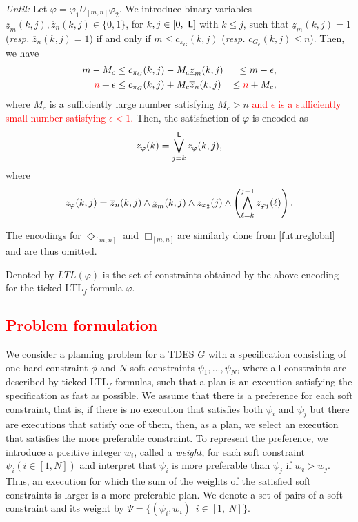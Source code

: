 \documentclass[journal,twoside,web]{IEEEtran}
\newcommand{\req}[1]{\eqref{#1}}
\newcommand{\Len}{{\sf L}}
\newcommand{\red}[1]{\textcolor{red}{#1}}
\begin{document}
\textit{Until:} 
Let $\varphi = \varphi_1 U_{[m,n]} \varphi_2$. We introduce binary variables $\underline{z}_m (k, j), \overline{z}_n (k, j) \in \{0, 1\}$, for $k, j \in [0,\ \Len]$ with $k\leq j$,
such that $\underline{z}_m (k,j) = 1$ ({\sl resp.} $\overline{z}_n (k, j) = 1$) if and only if $m \leq c_{\pi_G} (k, j)$ ({\sl resp.} $c_{G_e}(k,j) \leq n$). Then, we have 
\begin{eqnarray}
m - M_c &\leq c_{\pi_G} (k, j) - M_c \underline{z}_m(k,j) &\leq m - \epsilon, \notag\\ 
\red{n} + \epsilon  &\leq  c_{\pi_G} (k, j) + M_c \overline{z}_n(k,j) &\leq \red{n}+M_c, \notag
\end{eqnarray}
where $M_c$ is a sufficiently large number satisfying $M_c >n$ \red{and $\epsilon$ is a sufficiently small number satisfying $\epsilon<1$.} 
Then, the satisfaction of $\varphi$ is encoded as 
\begin{align}%
z_\varphi (k) = \bigvee^{\Len} _{j=k} z_\varphi (k, j),
\end{align}
where 
\begin{align}%
z_\varphi (k, j) = \overline{z}_n (k,j) \wedge  \underline{z}_m (k,j) \wedge z_{\varphi_2} (j) \wedge \left(\bigwedge^{j-1} _{\ell=k} z_{\varphi_1} (\ell) \right).  \notag 
\end{align}

The encodings for $\Diamond_{[m,n]}$ and $\Box_{[m,n]}$are similarly done from  \req{futureglobal} and are thus omitted. 
%

Denoted by $LTL(\varphi)$ is the set of constraints obtained by the above encoding for the ticked LTL$_f$ formula $\varphi$. 



%
\red{
\subsection{Problem formulation}\label{sec:pbm}
}
%
We consider a planning problem for a TDES $G$ with a specification consisting of one hard constraint $\phi$ and $N$ soft constraints $\psi_1,...,\psi_N$, where all constraints are described by ticked LTL$_f$ formulas, such that a plan is an execution satisfying the specification as fast as possible.
We assume that there is a preference for each soft constraint, that is, if there is no execution that satisfies both $\psi_i$ and $\psi_j$ but there are executions that satisfy one of them, then, as a plan, we select an execution that satisfies the more preferable constraint.  To represent the preference, we introduce a positive integer $w_i$, called a {\sl weight}, for each soft constraint $\psi_i (i \in [1,N])$ and interpret that $\psi_i$ is more preferable than $\psi_j$ if $w_i >w_j$. Thus, an execution for which the sum of the weights of the satisfied soft constraints is larger is a more preferable plan.
We denote a set of pairs of a soft constraint and its weight by $\Psi=\{(\psi_i, w_i)|~i\in[1,~N]\}$.
\end{document}
